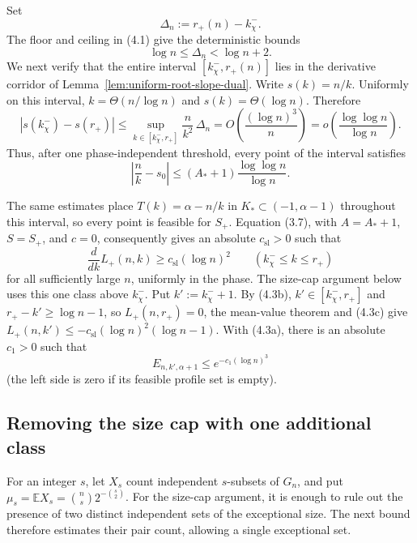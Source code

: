 \documentclass[a4paper,10pt,reqno]{amsart}
\numberwithin{equation}{section}
\theoremstyle{plain}
\theoremstyle{remark}
\begin{document}
Set
\[
  \Delta_n:=r_+(n)-k_\chi^-.
\]
The floor and ceiling in (4.1) give the deterministic bounds
\begin{equation*}
  \log n\le\Delta_n<\log n+2.
  \tag{4.3b}
\end{equation*}
We next verify that the entire interval
$[k_\chi^-,r_+(n)]$ lies in the derivative corridor of
Lemma~\ref{lem:uniform-root-slope-dual}. Write
$s(k)=n/k$. Uniformly on this interval,
$k=\Theta(n/\log n)$ and $s(k)=\Theta(\log n)$. Therefore
\[
  |s(k_\chi^-)-s(r_+)|
  \le
  \sup_{k\in[k_\chi^-,r_+]}
  \frac{n}{k^2}\,\Delta_n
  =O\!\left(\frac{(\log n)^3}{n}\right)
  =o\!\left(\frac{\log\log n}{\log n}\right).
\]
Thus, after one phase-independent threshold, every point of the interval
satisfies
\[
  \left|\frac nk-s_0\right|
  \le (A_*+1)\frac{\log\log n}{\log n}.
\]

The same estimates place $T(k)=\alpha-n/k$ in
$K_*\subset(-1,\alpha-1)$ throughout this interval, so every point is
feasible for $S_+$. Equation (3.7), with $A=A_*+1$, $S=S_+$, and $c=0$,
consequently gives an
absolute $c_{\mathrm{sl}}>0$ such that
\begin{equation*}
  \frac{d}{dk}L_+(n,k)\ge c_{\mathrm{sl}}(\log n)^2
  \qquad
  (k_\chi^-\le k\le r_+)
  \tag{4.3c}
\end{equation*}
for all sufficiently large $n$, uniformly in the phase. The size-cap
argument below uses this one class above $k_\chi^-$. Put $k':=k_\chi^-+1$.
By (4.3b), $k'\in[k_\chi^-,r_+]$ and $r_+-k'\ge\log n-1$, so
$L_+(n,r_+)=0$, the mean-value theorem and (4.3c) give
$L_+(n,k')\le-c_{\mathrm{sl}}(\log n)^2(\log n-1)$. With (4.3a), there is an
absolute $c_1>0$ such that
\begin{equation*}
  E_{n,k',\alpha+1}\le e^{-c_1(\log n)^3}
  \tag{4.4}
\end{equation*}
(the left side is zero if its feasible profile set is empty).

\subsection*{Removing the size cap with one additional class}

For an integer \(s\), let \(X_s\) count independent \(s\)-subsets of \(G_n\),
and put \(\mu_s=\mathbb E X_s=\binom ns2^{-\binom s2}\).
For the size-cap argument, it is enough to rule out the presence of two
distinct independent sets of the exceptional size. The next bound therefore
estimates their pair count, allowing a single exceptional set.
\end{document}
